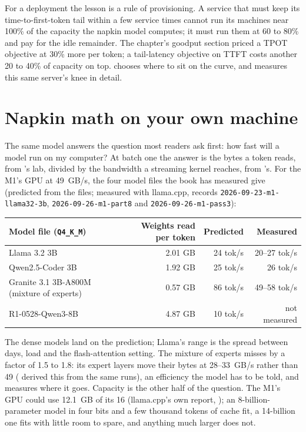 For a deployment the lesson is a rule of provisioning. A service that must keep
its time-to-first-token tail within a few service times cannot run its machines
near 100\% of the capacity the napkin model computes; it must run them at 60 to
80\% and pay for the idle remainder. The chapter's goodput section priced a TPOT
objective at 30\% more per token; a tail-latency objective on TTFT costs another
20 to 40\% of capacity on top.  chooses where to sit on the
curve, and  measures this same server's knee in detail.

\section{Napkin math on your own machine}

The same model answers the question most readers ask first: how fast will a
model run on my computer? At batch one the answer is the bytes a token reads,
from 's lab, divided by the bandwidth a streaming kernel
reaches, from 's. For the M1's GPU at 49~GB/s, the four model
files the book has measured give (predicted from the files; measured with
llama.cpp, records \texttt{2026-09-23-m1-llama32-3b}, \texttt{2026-09-26-m1-part8}
and \texttt{2026-09-26-m1-pass3}):

\begin{center}\small
\begin{tabular}{@{}lrrr@{}}
\toprule
Model file (\texttt{Q4\_K\_M}) & Weights read per token & Predicted & Measured \\
\midrule
Llama 3.2 3B & 2.01 GB & 24 tok/s & 20--27 tok/s \\
Qwen2.5-Coder 3B & 1.92 GB & 25 tok/s & 26 tok/s \\
Granite 3.1 3B-A800M (mixture of experts) & 0.57 GB & 86 tok/s & 49--58 tok/s \\
R1-0528-Qwen3-8B & 4.87 GB & 10 tok/s & not measured \\
\bottomrule
\end{tabular}
\end{center}

\noindent The dense models land on the prediction; Llama's range is the spread
between days, load and the flash-attention setting. The mixture of experts
misses by a factor of 1.5 to 1.8: its expert layers move their bytes at 28--33~GB/s
rather than 49 ( derived this from the same runs), an
efficiency the model has to be told, and  measures
where it goes. Capacity is the other half of the question. The M1's GPU could use
12.1~GB of its 16 (llama.cpp's own report, ); an 8-billion-parameter
model in four bits and a few thousand tokens of cache fit, a 14-billion one fits
with little room to spare, and anything much larger does not.

